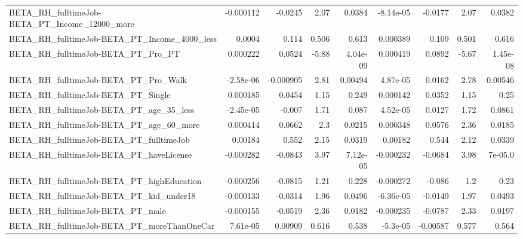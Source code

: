 \begin{tabular}{lrrrrrrrr}
BETA\_RH\_fulltimeJob-BETA\_PT\_Income\_12000\_more      &   -0.000112 &      -0.0245 &      2.07 &   0.0384 &  -8.14e-05 &     -0.0177 &         2.07 &        0.0382 \\
BETA\_RH\_fulltimeJob-BETA\_PT\_Income\_4000\_less       &      0.0004 &        0.114 &     0.506 &    0.613 &   0.000389 &       0.109 &        0.501 &         0.616 \\
BETA\_RH\_fulltimeJob-BETA\_PT\_Pro\_PT                 &    0.000222 &       0.0524 &     -5.88 & 4.04e-09 &   0.000419 &      0.0892 &        -5.67 &      1.45e-08 \\
BETA\_RH\_fulltimeJob-BETA\_PT\_Pro\_Walk               &   -2.58e-06 &    -0.000905 &      2.81 &  0.00494 &   4.87e-05 &      0.0162 &         2.78 &       0.00546 \\
BETA\_RH\_fulltimeJob-BETA\_PT\_Single                 &    0.000185 &       0.0454 &      1.15 &    0.249 &   0.000142 &      0.0352 &         1.15 &          0.25 \\
BETA\_RH\_fulltimeJob-BETA\_PT\_age\_35\_less            &   -2.45e-05 &       -0.007 &      1.71 &    0.087 &   4.52e-05 &      0.0127 &         1.72 &        0.0861 \\
BETA\_RH\_fulltimeJob-BETA\_PT\_age\_60\_more            &    0.000414 &       0.0662 &       2.3 &   0.0215 &   0.000348 &      0.0576 &         2.36 &        0.0185 \\
BETA\_RH\_fulltimeJob-BETA\_PT\_fulltimeJob            &     0.00184 &        0.552 &      2.15 &   0.0319 &    0.00182 &       0.544 &         2.12 &        0.0339 \\
BETA\_RH\_fulltimeJob-BETA\_PT\_haveLicense            &   -0.000282 &      -0.0843 &      3.97 & 7.12e-05 &  -0.000232 &     -0.0684 &         3.98 &       7e-05.0 \\
BETA\_RH\_fulltimeJob-BETA\_PT\_highEducation          &   -0.000256 &      -0.0815 &      1.21 &    0.228 &  -0.000272 &      -0.086 &          1.2 &          0.23 \\
BETA\_RH\_fulltimeJob-BETA\_PT\_kid\_under18            &   -0.000133 &      -0.0314 &      1.96 &   0.0496 &  -6.36e-05 &     -0.0149 &         1.97 &        0.0493 \\
BETA\_RH\_fulltimeJob-BETA\_PT\_male                   &   -0.000155 &      -0.0519 &      2.36 &   0.0182 &  -0.000235 &     -0.0787 &         2.33 &        0.0197 \\
BETA\_RH\_fulltimeJob-BETA\_PT\_moreThanOneCar         &    7.61e-05 &      0.00909 &     0.616 &    0.538 &   -5.3e-05 &    -0.00587 &        0.577 &         0.564 \\

\end{tabular}
